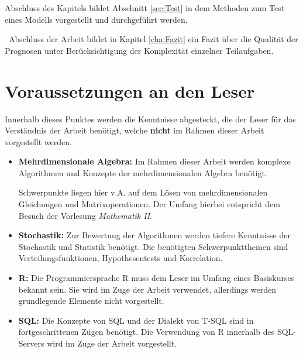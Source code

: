 Abschluss des Kapitels bildet Abschnitt \ref{sec:Test} in dem Methoden zum Test eines Modells vorgestellt und durchgeführt werden. 

~\newline Abschluss der Arbeit bildet in Kapitel \ref{cha:Fazit} ein Fazit über die Qualität der Prognosen unter Berücksichtigung der Komplexität einzelner Teilaufgaben.
\section{Voraussetzungen an den Leser}
\label{sec:Vorraussetzungen}
Innerhalb dieses Punktes werden die Kenntnisse abgesteckt, die der Leser für das Verständnis der Arbeit benötigt, welche \textbf{nicht} im Rahmen dieser Arbeit vorgestellt werden. 

\begin{itemize}
	\item \textbf{Mehrdimensionale Algebra:} Im Rahmen dieser Arbeit werden komplexe Algorithmen und Konzepte der mehrdimensionalen Algebra benötigt. 
	
	Schwerpunkte liegen hier v.A. auf dem Lösen von mehrdimensionalen Gleichungen und Matrixoperationen. Der Umfang hierbei entspricht dem Besuch der Vorlesung \textit{Mathematik II}. 
	\item \textbf{Stochastik:}  Zur Bewertung der Algorithmen werden tiefere Kenntnisse der Stochastik und Statistik benötigt. Die benötigten Schwerpunktthemen sind Verteilungsfunktionen, Hypothesentests und Korrelation. 
	\item \textbf{R:} Die Programmiersprache R muss dem Leser im Umfang eines Basiskurses bekannt sein. Sie wird im Zuge der Arbeit verwendet, allerdings werden grundlegende Elemente nicht vorgestellt. 
	\item \textbf{SQL:} Die Konzepte von SQL und der Dialekt von T-SQL sind in fortgeschrittenen Zügen benötigt. Die Verwendung von R innerhalb des SQL-Servers wird im Zuge der Arbeit vorgestellt. 
\end{itemize}
